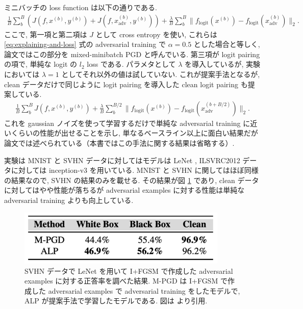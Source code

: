 ミニバッチの loss function は以下の通りである.
%
\begin{eqnarray}
\frac{1}{B} \sum_b^B \left( J(f, x^{(b)}, y^{(b)}) + J(f, x^{(b)}_{\text{adv}}, y^{(b)}) \right) + \frac{\lambda}{B} \sum_b^B \| f_{\text{logit}} (x^{(b)}) - f_{\text{logit}} (x^{(b)}_{\text{adv}}) \|_2.
\label{eq:adversarial-logit-loss}
\end{eqnarray}
%
ここで, 第一項と第二項は $J$ として cross entropy を使い, これらは \ref{eq:explaining-and-loss} 式の adversarial training で $\alpha = 0.5$ とした場合と等しく, 論文ではこの部分を mixed-minibatch PGD と呼んでいる.
第三項が logit pairing の項で, 単純な logit の $l_2$ loss である.
パラメタとして $\lambda$ を導入しているが, 実験においては $\lambda = 1$ としてそれ以外の値は試していない.
これが提案手法となるが, clean データだけで同じように logit pairing を導入した clean logit pairing も提案している.
%
\begin{eqnarray}
\frac{1}{B} \sum_b^{B} J(f, x^{(b)}, y^{(b)}) + \frac{\lambda}{B} \sum_b^{B/2} \| f_{\text{logit}} (x^{(b)}) - f_{\text{logit}} (x^{(b + B/2)}_{\text{adv}}) \|_2.
\label{eq:adversarial-logit-clp}
\end{eqnarray}
%
これを gaussian ノイズを使って学習するだけで単純な adversarial training に近いくらいの性能が出せることを示し, 単なるベースライン以上に面白い結果だが論文では述べられている（本書ではこの手法に関する結果は省略する）.

実験は MNIST と SVHN データに対してはモデルは LeNet \cite{lecun1998gradient}, ILSVRC2012 データに対しては inception-v3 を用いている.
MNIST と SVHN に関してはほぼ同様の結果なので, SVHN の結果のみを載せる.
その結果が図 \ref{fig:adversarial-logit-result-svhn} であり, clean データに対してはやや性能が落ちるが adversarial examples に対する性能は単純な adversarial training よりも向上している.
%
\begin{figure}[htbp]
\begin{center}
\includegraphics[width=10.0cm]{figures/adversarial-logit-result-svhn.pdf}
\end{center}
\caption{
SVHN データで LeNet を用いて I+FGSM で作成した adversarial examples に対する正答率を調べた結果.
M-PGD は I+FGSM で作成した adversarial examples で adversarial training をしたモデルで, ALP が提案手法で学習したモデルである.
図は \cite{kannan2018adversarial} より引用.
}
\label{fig:adversarial-logit-result-svhn}
\end{figure}
%

